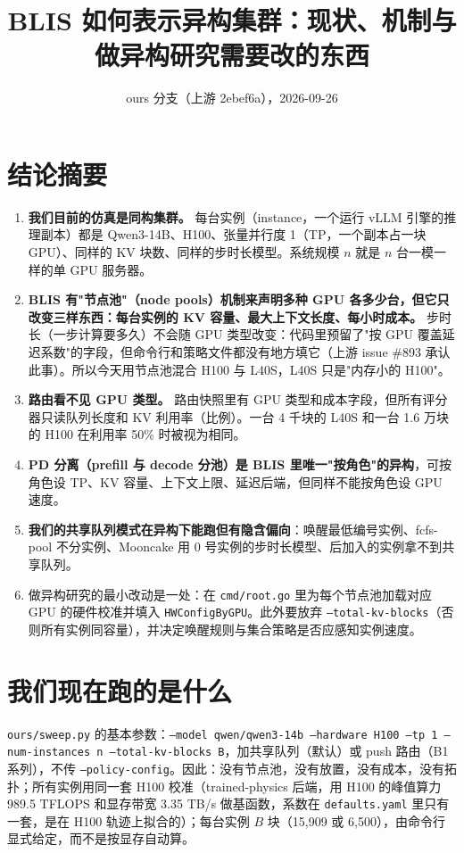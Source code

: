 \documentclass[11pt,a4paper,fontset=windows]{ctexart}
\title{BLIS 如何表示异构集群：现状、机制与做异构研究需要改的东西}
\author{ours 分支（上游 2ebef6a），2026-09-26}
\date{}
\begin{document}
\maketitle

\section{结论摘要}

\begin{enumerate}
\item \textbf{我们目前的仿真是同构集群。} 每台实例（instance，一个运行 vLLM 引擎的推理副本）都是 Qwen3-14B、H100、张量并行度 1（TP，一个副本占一块 GPU）、同样的 KV 块数、同样的步时长模型。系统规模 $n$ 就是 $n$ 台一模一样的单 GPU 服务器。
\item \textbf{BLIS 有"节点池"（node pools）机制来声明多种 GPU 各多少台，但它只改变三样东西：每台实例的 KV 容量、最大上下文长度、每小时成本。} 步时长（一步计算要多久）不会随 GPU 类型改变：代码里预留了"按 GPU 覆盖延迟系数"的字段，但命令行和策略文件都没有地方填它（上游 issue \#893 承认此事）。所以今天用节点池混合 H100 与 L40S，L40S 只是"内存小的 H100"。
\item \textbf{路由看不见 GPU 类型。} 路由快照里有 GPU 类型和成本字段，但所有评分器只读队列长度和 KV 利用率（比例）。一台 4 千块的 L40S 和一台 1.6 万块的 H100 在利用率 50\% 时被视为相同。
\item \textbf{PD 分离（prefill 与 decode 分池）是 BLIS 里唯一"按角色"的异构}，可按角色设 TP、KV 容量、上下文上限、延迟后端，但同样不能按角色设 GPU 速度。
\item \textbf{我们的共享队列模式在异构下能跑但有隐含偏向}：唤醒最低编号实例、fcfs-pool 不分实例、Mooncake 用 0 号实例的步时长模型、后加入的实例拿不到共享队列。
\item 做异构研究的最小改动是一处：在 \texttt{cmd/root.go} 里为每个节点池加载对应 GPU 的硬件校准并填入 \texttt{HWConfigByGPU}。此外要放弃 \texttt{--total-kv-blocks}（否则所有实例同容量），并决定唤醒规则与集合策略是否应感知实例速度。
\end{enumerate}

\section{我们现在跑的是什么}

\texttt{ours/sweep.py} 的基本参数：\texttt{--model qwen/qwen3-14b --hardware H100 --tp 1 --num-instances n --total-kv-blocks B}，加共享队列（默认）或 push 路由（B1 系列），不传 \texttt{--policy-config}。因此：没有节点池，没有放置，没有成本，没有拓扑；所有实例用同一套 H100 校准（trained-physics 后端，用 H100 的峰值算力 989.5 TFLOPS 和显存带宽 3.35 TB/s 做基函数，系数在 \texttt{defaults.yaml} 里只有一套，是在 H100 轨迹上拟合的）；每台实例 $B$ 块（15,909 或 6,500），由命令行显式给定，而不是按显存自动算。
\end{document}
